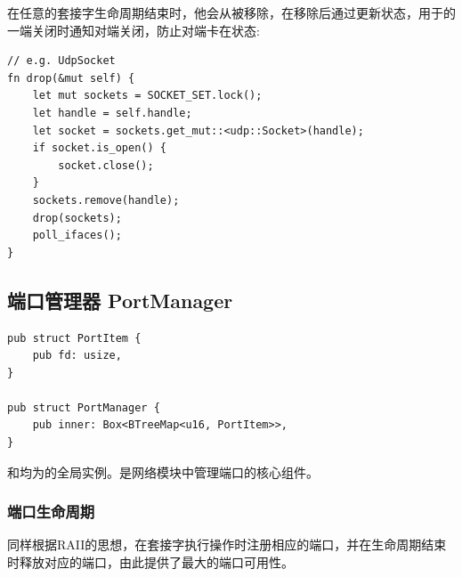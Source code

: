 \documentclass{article}
\begin{document}
在任意的套接字生命周期结束时，他会从被移除，在移除后通过更新状态，用于的一端关闭时通知对端关闭，防止对端卡在状态:
\begin{lstlisting}
// e.g. UdpSocket
fn drop(&mut self) {
    let mut sockets = SOCKET_SET.lock();
    let handle = self.handle;
    let socket = sockets.get_mut::<udp::Socket>(handle);
    if socket.is_open() {
        socket.close();
    }
    sockets.remove(handle);
    drop(sockets);
    poll_ifaces();
}
\end{lstlisting}

\subsection{端口管理器 PortManager}
\begin{lstlisting}
pub struct PortItem {
    pub fd: usize,
}

pub struct PortManager {
    pub inner: Box<BTreeMap<u16, PortItem>>,
}
\end{lstlisting}

和均为的全局实例。是网络模块中管理端口的核心组件。

\subsubsection{端口生命周期}

同样根据RAII的思想，在套接字执行操作时注册相应的端口，并在生命周期结束时释放对应的端口，由此提供了最大的端口可用性。
\end{document}

